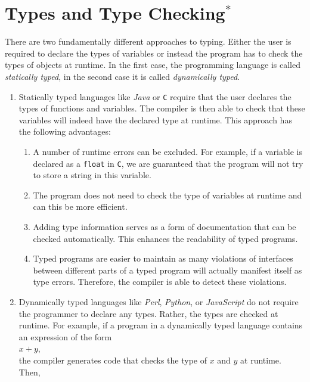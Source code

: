 \chapter{Types and Type Checking$^*$}
There are two fundamentally different approaches to typing.  Either the user is
required to declare the types of variables or instead the program has to check the types
of objects at runtime.  In the first case, the programming language is called 
\emph{statically typed}, in the second case it is called \emph{dynamically typed}.
\begin{enumerate}
\item Statically typed languages like \textsl{Java} or \texttt{C} require that the user
      declares the types of functions and variables.  The compiler is then able to check
      that these variables will indeed have the declared type at runtime.  This approach
      has the following advantages:
      \begin{enumerate}
      \item A number of runtime errors can be excluded.  For example, if a variable is 
            declared as a \texttt{float} in \texttt{C}, we are guaranteed that the program
            will not try to store a string in this variable.
      \item The program does not need to check the type of variables at runtime and can
            this be more efficient.
      \item Adding type information serves as a form of documentation that can be checked
            automatically.  This enhances the readability of typed programs.
      \item Typed programs are easier to maintain as many violations of interfaces between
            different parts of a typed program will actually manifest itself as type
            errors.  Therefore, the compiler is able to detect these violations.
      \end{enumerate}
\item Dynamically typed languages like \textsl{Perl}, \textsl{Python}, or
      \textsl{JavaScript} do not require the programmer to declare any types.  Rather, the types
      are checked at runtime.  For example, if a program in a dynamically typed language
      contains an expression of the form
      \\[0.2cm]
      \hspace*{1.3cm}
      $x + y$,
      \\[0.2cm]
      the compiler generates code that checks the type of $x$ and $y$ at runtime.  Then,

\end{enumerate}
